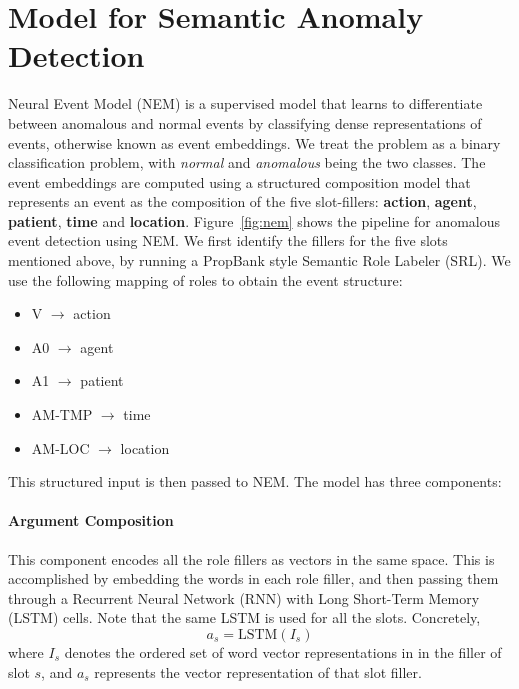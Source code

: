 \section{Model for Semantic Anomaly Detection}
Neural Event Model (NEM) is a supervised model that learns to differentiate between anomalous and
normal events by 
classifying dense representations of events, otherwise known as event embeddings. We treat the problem as a binary classification problem, with
\textit{normal} and \textit{anomalous} being the two classes.
The event embeddings are computed using a structured composition model
that represents an event as the composition of the five slot-fillers: \textbf{action},
\textbf{agent}, \textbf{patient}, \textbf{time} and \textbf{location}.
Figure~\ref{fig:nem} shows the pipeline for anomalous event detection using NEM\@. We
first identify the fillers for the five slots mentioned above, by running a PropBank \citep{palmer2005proposition}
style Semantic Role Labeler (SRL). We use the following mapping of roles to obtain the event structure:
\begin{itemize}
 \item V $\rightarrow$ action
 \item A0 $\rightarrow$ agent
 \item A1 $\rightarrow$ patient
 \item AM-TMP $\rightarrow$ time
 \item AM-LOC $\rightarrow$ location
\end{itemize}
This structured input is then passed to NEM\@. The model has three components:

\paragraph{Argument Composition} This component encodes all the role fillers as vectors in the same space.
This is accomplished by embedding the words in each role filler, and then passing them through a Recurrent
Neural Network (RNN) with Long Short-Term Memory (LSTM) \citep{hochreiter1997long} cells. Note that the same LSTM is
used for all the slots. Concretely,
\begin{equation}
 a_s = \text{LSTM}(I_s)
\end{equation}
where $I_s$ denotes the ordered set of word vector representations in in the filler of slot $s$, and
$a_s$ represents the vector representation of that slot filler.

